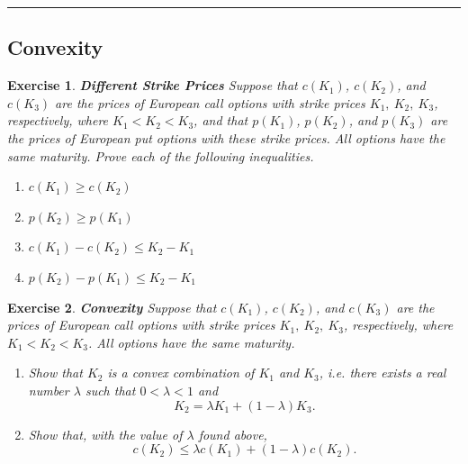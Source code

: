 \documentclass[letterpaper,10pt]{article}
\newtheorem{ex}{Exercise}
\begin{document}
\bigskip

\hrule

\bigskip

\subsection{Convexity}


\begin{ex} {\bf Different Strike Prices}
Suppose that $c(K_1)$, $c(K_2)$, and $c(K_3)$ are the prices of European call options with strike prices $K_1,~K_2,~K_3$, respectively, where $K_1<K_2<K_3$, and that $p(K_1)$, $p(K_2)$, and $p(K_3)$ are the prices of European put options with these strike prices.  All options have the same maturity.  Prove each of the following inequalities.

\begin{enumerate}

\item[(a)] $c(K_1)\geq c(K_2)$

\item[(b)] $p(K_2)\geq p(K_1)$

\item[(c)] $c(K_1)-c(K_2)\leq K_2-K_1$

\item[(d)] $p(K_2)-p(K_1)\leq K_2-K_1$




\end{enumerate}

\end{ex}

\begin{ex}{\bf Convexity}
Suppose that $c(K_1)$, $c(K_2)$, and $c(K_3)$ are the prices of European call options with strike prices $K_1,~K_2,~K_3$, respectively, where $K_1<K_2<K_3$.  All options have the same maturity.  

\begin{enumerate}

\item[(a)] Show that $K_2$ is a convex combination of $K_1$ and $K_3$, i.e. there exists a real number $\lambda$ such that $0<\lambda<1$ and $$K_2=\lambda K_1+(1-\lambda)K_3.$$



\item[(b)] Show that, with the value of $\lambda$ found above, $$c(K_2)\leq \lambda c(K_1)+(1-\lambda)c(K_2).$$

\end{enumerate}

\end{ex}
\end{document}
